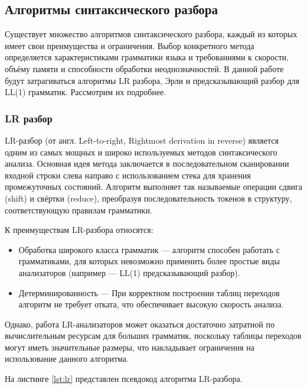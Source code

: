 \documentclass[14pt, russian]{scrartcl}
\begin{document}
\subsection{Алгоритмы синтаксического разбора}

Существует множество алгоритмов синтаксического разбора, каждый из которых имеет свои преимущества и ограничения.
Выбор конкретного метода определяется характеристиками грамматики языка и требованиями к скорости,
объёму памяти и способности обработки неоднозначностей. В данной работе будут затрагиваться алгоритмы LR разбора,
Эрли и предсказывающий разбор для LL(1) грамматик. Рассмотрим их подробнее.

\subsubsection{LR разбор}

LR-разбор\cite{lr0} (от англ. Left-to-right, Rightmost derivation in reverse) является одним из самых мощных и широко
используемых методов синтаксического анализа. Основная идея метода заключается в последовательном сканировании
входной строки слева направо с использованием стека для хранения промежуточных состояний. Алгоритм выполняет
так называемые операции сдвига (shift) и свёртки (reduce), преобразуя последовательность токенов в структуру,
соответствующую правилам грамматики.

К преимуществам LR-разбора относятся:

\begin{itemize}
	\item Обработка широкого класса грамматик --- алгоритм способен работать с грамматиками, для которых невозможно
	применить более простые виды анализаторов (например --- LL(1) предсказывающий разбор).
	\item Детерминированность --- При корректном построении таблиц переходов алгоритм не требует отката, что
	обеспечивает высокую скорость анализа.
\end{itemize}

Однако, работа LR-анализаторов может оказаться достаточно затратной по вычислительным ресурсам для больших грамматик,
поскольку таблицы переходов могут иметь значительные размеры, что накладывает ограничения на использование
данного алгоритма.

На листинге \ref{lst:lr} представлен псевдокод алгоритма LR-разбора.
\end{document}
